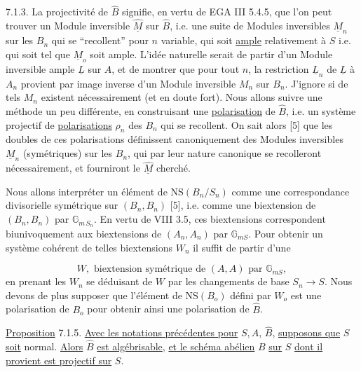 
7.1.3. La projectivité de $\hat{B}$ signifie, en vertu de EGA III 5.4.5, que l'on peut trouver un Module inversible $\underline{\hat{M}}$ sur $\hat{B}$, i.e. une suite de Modules inversibles $\underline{M}_n$ sur les $B_n$ qui se ``recollent'' pour $n$ variable, qui soit \underline{ample} relativement à $S$ i.e. qui soit tel que $\underline{M}_o$ soit ample. L'idée naturelle serait de partir d'un Module inversible ample $\underline{L}$ sur $A$, et de montrer que pour tout $n$, la restriction $\underline{L}_n$ de $\underline{L}$ à $A_n$ provient par image inverse d'un Module inversible $M_n$ sur $B_n$. J'ignore si de tels $M_n$ existent nécessairement (et en doute fort). Nous allons suivre une méthode un peu différente, en construisant une \underline{polarisation} de $\hat{B}$, i.e. un système projectif de \underline{polarisations} $\rho_n$ des $B_n$ qui se recollent. On sait alors [5] que les doubles de ces polarisations définissent canoniquement des Modules inversibles $\underline{M}_n$ (symétriques) sur les $B_n$, qui par leur nature canonique se recolleront nécessairement, et fourniront le $\underline{\hat{M}}$ cherché.

Nous allons interpréter un élément de $\mathrm{NS}(B_n/S_n)$ comme une correspondance divisorielle symétrique sur $(B_n,B_n)$ [5], i.e. comme une biextension de $(B_n,B_n)$ par $\mathbb{G}_{m\,S_n}$. En vertu de VIII 3.5, ces biextensions correspondent biunivoquement aux biextensions de $(A_n,A_n)$ par $\mathbb{G}_{mS}$. Pour obtenir un système cohérent de telles biextensions $W_n$ il suffit de partir d'une

\begin{equation}\tag{7.1.4}
W, \text{ biextension symétrique de } (A,A) \text{ par } \mathbb{G}_{mS} ,
\end{equation}
en prenant les $W_n$ se déduisant de $W$ par les changements de base $S_n \longrightarrow S$. Nous devons de plus supposer que l'élément de $\mathrm{NS}(B_o)$ défini par $W_o$ est une polarisation de $B_o$ pour obtenir ainsi une polarisation de $\hat{B}$.



\underline{Proposition} 7.1.5. \underline{Avec les notations précédentes pour} $S,A$, $\hat{B}$, \underline{supposons que} $S$ \underline{soit} normal. \underline{Alors} $\hat{B}$ \underline{est algébrisable}, \underline{et le schéma abélien} $B$ \underline{sur} $S$ \underline{dont il provient est projectif sur} $S$.

